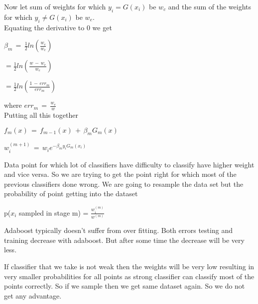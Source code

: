 \documentclass[twoside]{article}
\begin{document}
Now let sum of weights for which $y_{i} = G(x_{i})$ be $w_{c}$ and the sum of the weights for which $y_{i} \neq G(x_{i})$ be $w_{e}$.\\
Equating the derivative to 0 we get 
\begin{center}
$\beta_{m}\, = \, \frac{1}{2}ln(\frac{w_{c}}{w_{e}})$\\
\end{center}
\begin{center}
$= \frac{1}{2} ln(\frac{w \,-\,w_{e} }{w_{e}})$\\
\end{center}
\begin{center}
$= \frac{1}{2} ln(\frac{1\,-\, err_{m}}{err_{m}})$
\end{center}
where $err_{m}\, = \,\frac{w_{e}}{w}$\\
Putting all this together\\
\begin{center}
$f_{m}(x)\,=\,f_{m-1}(x)\,+\,\beta_{m}G_{m}(x)$\\
\end{center}
\begin{center}
$w_{i}^{(m+1)}\,=\,w_{i}e^{-\beta_{m}y_{i}G_{m}(x_{i})}$
\end{center}
Data point for which lot of classifiers have difficulty to classify have higher weight and vice versa. So we are trying to get the point right for which most of the previous classifiers done wrong. We are going to resample the data set but the probability of point getting into the dataset
\begin{center}
p($x_{i}$ sampled in stage m) = $\frac{w_{i}^{(m)}}{w^{(m)}}$
\end{center}
Adaboost typically doesn't suffer from over fitting. Both errors testing and training decrease with adaboost. But after some time the decrease will be very less.




If classifier that we take is not weak then the weights will be very low resulting in very smaller probabilities for all points as strong classifier can classify most of the points correctly. So if we sample then we get same dataset again. So we do not get any advantage.\\
\end{document}
